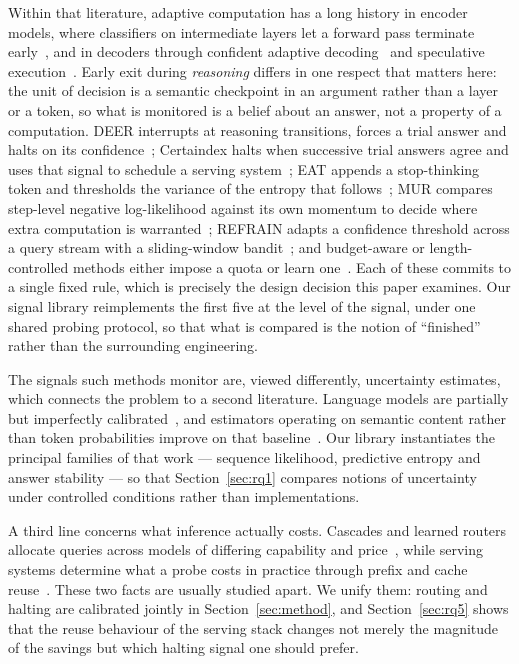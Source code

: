 \documentclass[acmsmall]{acmart}
\theoremstyle{acmdefinition}%
\theoremstyle{acmplain}}{}%
\begin{document}
Within that literature, adaptive computation has a long history in encoder models, where classifiers on intermediate layers let a forward pass terminate early~\cite{xin2020deebert,liu2020fastbert,zhou2020bert,elbayad2020depth,han2021dynamic}, and in decoders through confident adaptive decoding~\cite{schuster2022confident} and speculative execution~\cite{leviathan2023fast}. Early exit during \emph{reasoning} differs in one respect that matters here: the unit of decision is a semantic checkpoint in an argument rather than a layer or a token, so what is monitored is a belief about an answer, not a property of a computation. DEER interrupts at reasoning transitions, forces a trial answer and halts on its confidence~\cite{yang2025deer}; Certaindex halts when successive trial answers agree and uses that signal to schedule a serving system~\cite{fu2024certaindex}; EAT appends a stop-thinking token and thresholds the variance of the entropy that follows~\cite{wang2025eat}; MUR compares step-level negative log-likelihood against its own momentum to decide where extra computation is warranted~\cite{yan2025mur}; REFRAIN adapts a confidence threshold across a query stream with a sliding-window bandit~\cite{sun2025refrain}; and budget-aware or length-controlled methods either impose a quota or learn one~\cite{han2024token,muennighoff2025s1,aggarwal2025l1,xu2025chain,ma2025reasoning,zhang2025adaptthink}. Each of these commits to a single fixed rule, which is precisely the design decision this paper examines. Our signal library reimplements the first five at the level of the signal, under one shared probing protocol, so that what is compared is the notion of ``finished'' rather than the surrounding engineering.

The signals such methods monitor are, viewed differently, uncertainty estimates, which connects the problem to a second literature. Language models are partially but imperfectly calibrated~\cite{kadavath2022language,desai2020calibration,jiang2021how}, and estimators operating on semantic content rather than token probabilities improve on that baseline~\cite{kuhn2023semantic,farquhar2024detecting,manakul2023selfcheckgpt,lin2022teaching}. Our library instantiates the principal families of that work --- sequence likelihood, predictive entropy and answer stability --- so that Section~\ref{sec:rq1} compares notions of uncertainty under controlled conditions rather than implementations.

A third line concerns what inference actually costs. Cascades and learned routers allocate queries across models of differing capability and price~\cite{chen2023frugalgpt,hu2024routerbench,ong2024routellm,ding2024hybrid}, while serving systems determine what a probe costs in practice through prefix and cache reuse~\cite{kwon2023efficient}. These two facts are usually studied apart. We unify them: routing and halting are calibrated jointly in Section~\ref{sec:method}, and Section~\ref{sec:rq5} shows that the reuse behaviour of the serving stack changes not merely the magnitude of the savings but which halting signal one should prefer.
\end{document}
